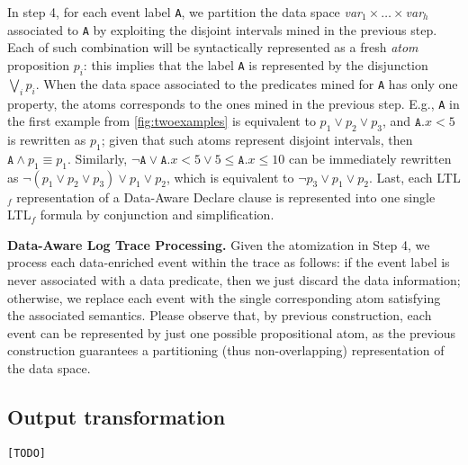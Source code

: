 In step 4, for each event label \texttt{A}, we partition the data space \textit{var}$_1\times\dots\times$\textit{var}$_h$ associated to \texttt{A} by exploiting the disjoint intervals mined in the previous step. Each of such combination will be syntactically represented as a fresh \textit{atom}  proposition $p_i$: this implies that the label \texttt{A} is represented by the disjunction $\bigvee_ip_i$. When the data space associated to the predicates mined for \texttt{A} has only one property,  the atoms corresponds to the ones mined in the previous step. E.g., \texttt{A} in the first example from \ref{fig:twoexamples} is equivalent to $p_1\vee p_2\vee p_3$, and $\texttt{A}.\textit{x}<5$ is rewritten as $p_1$; given that such atoms represent disjoint intervals, then $\texttt{A}\wedge p_1\equiv p_1$. Similarly, $\neg \texttt{A}\vee \texttt{A}.\textit{x}<5\vee 5\leq\texttt{A}.\textit{x}\leq 10$ can be immediately rewritten as $\neg(p_1\vee p_2\vee p_3)\vee p_1\vee p_2$, which is equivalent to $\neg p_3\vee p_1\vee p_2$. Last, each LTL$_f$ representation of a Data-Aware Declare clause is represented into one single LTL$_f$ formula by conjunction and simplification.

\textbf{Data-Aware Log Trace Processing.} Given the atomization in Step 4, we process each data-enriched event within the trace as follows: if the event label is never associated with a data predicate, then we just discard the data information; otherwise, we replace each event with the single corresponding atom satisfying the associated semantics. Please observe that, by previous construction, each event can be represented by just one possible propositional atom, as the previous construction guarantees a partitioning (thus non-overlapping) representation of the data space.

\subsection{Output transformation} \texttt{\color{red}[TODO]}